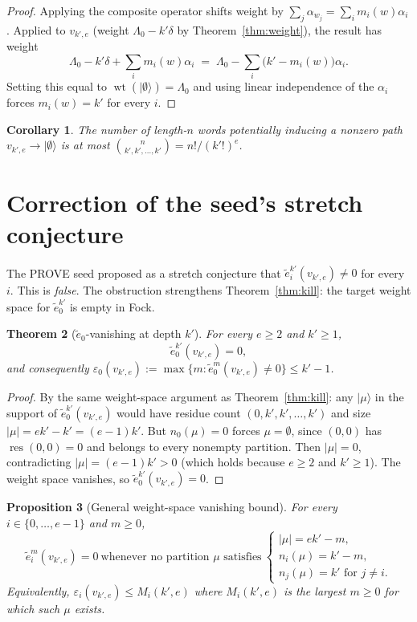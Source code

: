 \documentclass[11pt]{article}
\newtheorem{theorem}{Theorem}
\newtheorem{proposition}[theorem]{Proposition}
\newtheorem{corollary}[theorem]{Corollary}
\theoremstyle{definition}
\DeclareMathOperator{\wt}{wt}
\DeclareMathOperator{\res}{res}
\newcommand{\te}{\tilde e}
\newcommand{\eps}{\varepsilon}
\begin{document}
\begin{proof}
Applying the composite operator shifts weight by $\sum_j \alpha_{w_j} = \sum_i m_i(w)
\alpha_i$. Applied to $v_{k',e}$ (weight $\Lambda_0 - k'\delta$ by
Theorem~\ref{thm:weight}), the result has weight
\[
  \Lambda_0 - k'\delta + \sum_i m_i(w)\alpha_i
    \;=\; \Lambda_0 - \sum_i \bigl(k' - m_i(w)\bigr)\alpha_i.
\]
Setting this equal to $\wt(|\emptyset\rangle) = \Lambda_0$ and using linear independence
of the $\alpha_i$ forces $m_i(w) = k'$ for every $i$.
\end{proof}

\begin{corollary}\label{cor:multinom}
The number of length-$n$ words potentially inducing a nonzero path $v_{k',e}\to
|\emptyset\rangle$ is at most $\binom{n}{k',k',\ldots,k'} = n!/(k'!)^e$.
\end{corollary}

\section{Correction of the seed's stretch conjecture}\label{sec:correction}

The PROVE seed proposed as a stretch conjecture that $\te_i^{k'}(v_{k',e}) \ne 0$ for
every $i$. This is \emph{false}. The obstruction strengthens Theorem~\ref{thm:kill}: the
target weight space for $\te_0^{k'}$ is empty in Fock.

\begin{theorem}[$\te_0$-vanishing at depth $k'$]\label{thm:tilde-e-0-vanish}
For every $e\ge 2$ and $k'\ge 1$,
\[
  \te_0^{k'}(v_{k',e}) = 0,
\]
and consequently $\eps_0(v_{k',e}) := \max\{m : \te_0^m(v_{k',e}) \ne 0\} \le k' - 1$.
\end{theorem}

\begin{proof}
By the same weight-space argument as Theorem~\ref{thm:kill}: any $|\mu\rangle$ in the
support of $\te_0^{k'}(v_{k',e})$ would have residue count $(0, k', k', \ldots, k')$ and
size $|\mu| = ek' - k' = (e-1)k'$. But $n_0(\mu) = 0$ forces $\mu = \emptyset$, since
$(0,0)$ has $\res(0,0)=0$ and belongs to every nonempty partition. Then $|\mu| = 0$,
contradicting $|\mu| = (e-1)k' > 0$ (which holds because $e\ge 2$ and $k'\ge 1$). The
weight space vanishes, so $\te_0^{k'}(v_{k',e}) = 0$.
\end{proof}

\begin{proposition}[General weight-space vanishing bound]\label{prop:bound}
For every $i\in\{0,\ldots,e-1\}$ and $m\ge 0$,
\[
  \te_i^m(v_{k',e}) = 0
  \ \text{whenever no partition $\mu$ satisfies}\
  \begin{cases}
    |\mu| = ek' - m,\\
    n_i(\mu) = k' - m,\\
    n_j(\mu) = k' \text{ for } j\ne i.
  \end{cases}
\]
Equivalently, $\eps_i(v_{k',e}) \le M_i(k',e)$ where $M_i(k',e)$ is the largest $m\ge 0$
for which such $\mu$ exists.
\end{proposition}
\end{document}
